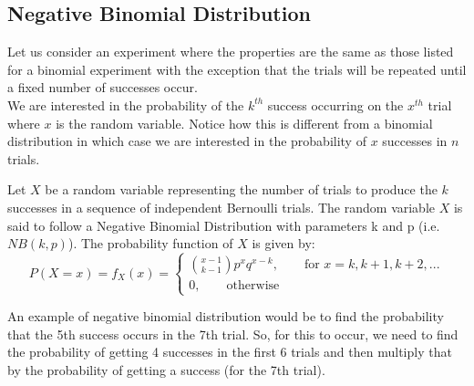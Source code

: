 \subsection{Negative Binomial Distribution}
Let us consider an experiment where the properties are the same as those listed for a binomial experiment with the exception that the trials will be repeated until a fixed number of successes occur. \\
We are interested in the probability of the $k^{th}$ success occurring on the $x^{th}$ trial where $x$ is the random variable. Notice how this is different from a binomial distribution in which case we are interested in the probability of $x$ successes in $n$ trials. \\
\begin{definition} 
Let $X$ be a random variable representing the number of trials to produce the $k$ successes in a sequence of independent Bernoulli trials. The random variable $X$ is said to follow a Negative Binomial Distribution with parameters k and p (i.e. $NB(k,p)$). The probability function of $X$ is given by:
$$
P(X = x) = f_X(x) = 
\begin{cases}
\binom{x-1}{k-1}p^x q^{x-k}, \qquad \text{for } x = k, k + 1, k + 2, ... \\
0, \qquad \text{otherwise}
\end{cases}
$$
\end{definition}
An example of negative binomial distribution would be to find the probability that the 5th success occurs in the 7th trial. So, for this to occur, we need to find the probability of getting 4 successes in the first 6 trials and then multiply that by the probability of getting a success (for the 7th trial).
